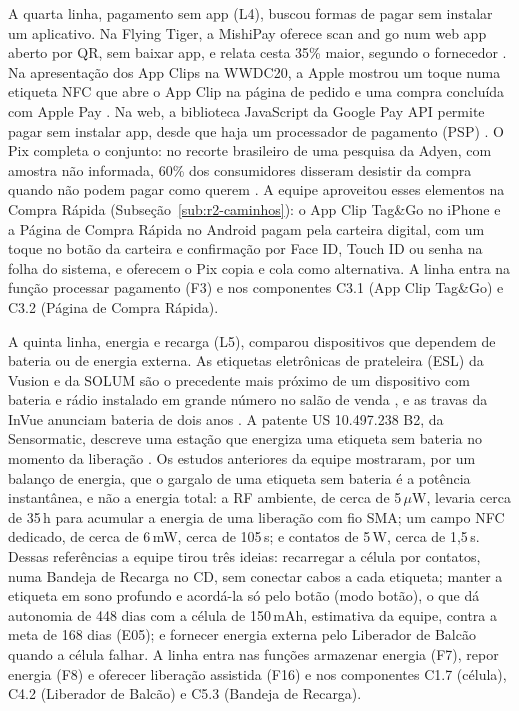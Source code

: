 A quarta linha, pagamento sem app (L4), buscou formas de pagar sem instalar um aplicativo. Na Flying Tiger, a MishiPay oferece scan and go num web app aberto por QR, sem baixar app, e relata cesta 35\% maior, segundo o fornecedor \cite{mishipay2026flyingtiger}. Na apresentação dos App Clips na WWDC20, a Apple mostrou um toque numa etiqueta NFC que abre o App Clip na página de pedido e uma compra concluída com Apple Pay \cite{apple2020wwdcappclips}. Na web, a biblioteca JavaScript da Google Pay API permite pagar sem instalar app, desde que haja um processador de pagamento (PSP) \cite{google2026paywebvisao}. O Pix completa o conjunto: no recorte brasileiro de uma pesquisa da Adyen, com amostra não informada, 60\% dos consumidores disseram desistir da compra quando não podem pagar como querem \cite{tiinside2026adyen}. A equipe aproveitou esses elementos na Compra Rápida (Subseção~\ref{sub:r2-caminhos}): o App Clip Tag\&Go no iPhone e a Página de Compra Rápida no Android pagam pela carteira digital, com um toque no botão da carteira e confirmação por Face ID, Touch ID ou senha na folha do sistema, e oferecem o Pix copia e cola como alternativa. A linha entra na função processar pagamento (F3) e nos componentes C3.1 (App Clip Tag\&Go) e C3.2 (Página de Compra Rápida).

A quinta linha, energia e recarga (L5), comparou dispositivos que dependem de bateria ou de energia externa. As etiquetas eletrônicas de prateleira (ESL) da Vusion e da SOLUM são o precedente mais próximo de um dispositivo com bateria e rádio instalado em grande número no salão de venda \cite{vusion2026esl,solum2026esl}, e as travas da InVue anunciam bateria de dois anos \cite{invue2026locks}. A patente US 10.497.238 B2, da Sensormatic, descreve uma estação que energiza uma etiqueta sem bateria no momento da liberação \cite{googlepatents2019us10497238}. Os estudos anteriores da equipe mostraram, por um balanço de energia, que o gargalo de uma etiqueta sem bateria é a potência instantânea, e não a energia total: a RF ambiente, de cerca de 5\,$\mu$W, levaria cerca de 35\,h para acumular a energia de uma liberação com fio SMA; um campo NFC dedicado, de cerca de 6\,mW, cerca de 105\,s; e contatos de 5\,W, cerca de 1,5\,s. Dessas referências a equipe tirou três ideias: recarregar a célula por contatos, numa Bandeja de Recarga no CD, sem conectar cabos a cada etiqueta; manter a etiqueta em sono profundo e acordá-la só pelo botão (modo botão), o que dá autonomia de 448 dias com a célula de 150\,mAh, estimativa da equipe, contra a meta de 168 dias (E05); e fornecer energia externa pelo Liberador de Balcão quando a célula falhar. A linha entra nas funções armazenar energia (F7), repor energia (F8) e oferecer liberação assistida (F16) e nos componentes C1.7 (célula), C4.2 (Liberador de Balcão) e C5.3 (Bandeja de Recarga).

